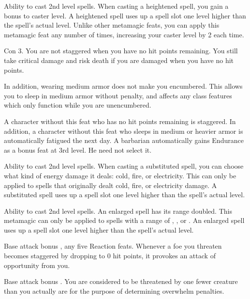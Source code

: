  Ability to cast 2nd level spells.
 When casting a heightened spell, you gain a  bonus to caster level. A heightened spell uses up a spell slot one level higher than the spell's actual level. Unlike other metamagic feats, you can apply this metamagic feat any number of times, increasing your caster level by 2 each time.

\featpre Con 3.
 You are not staggered when you have no hit points remaining. You still take critical damage and risk death if you are damaged when you have no hit points.

In addition, wearing medium armor does not make you encumbered. This allows you to sleep in medium armor without penalty, and affects any class features which only function while you are unencumbered.

 A character without this feat who has no hit points remaining is staggered. In addition, a character without this feat who sleeps in medium or heavier armor is automatically fatigued the next day.
 A barbarian automatically gains Endurance as a bonus feat at 3rd level. He need not select it.

 Ability to cast 2nd level spells.
 When casting a substituted spell, you can choose what kind of energy damage it deals: cold, fire, or electricity. This can only be applied to spells that originally dealt cold, fire, or electricity damage. A substituted spell uses up a spell slot one level higher than the spell's actual level.

 Ability to cast 2nd level spells.
 An enlarged spell has its range doubled. This metamagic can only be applied to spells with a range of \rngclose, \rngmed, or \rnglong. An enlarged spell uses up a spell slot one level higher than the spell's actual level.

 Base attack bonus , any five Reaction feats.
 Whenever a foe you threaten becomes staggered by dropping to 0 hit points, it provokes an attack of opportunity from you.

 Base attack bonus .
 You are considered to be threatened by one fewer creature than you actually are for the purpose of determining overwhelm penalties.

